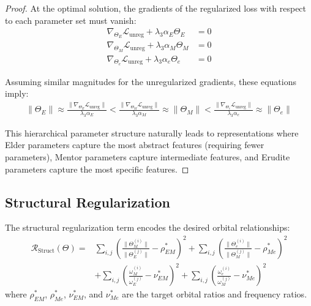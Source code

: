 \begin{proof}
At the optimal solution, the gradients of the regularized loss with respect to each parameter set must vanish:
\begin{align}
\nabla_{\Theta_E} \mathcal{L}_{\text{unreg}} + \lambda_3 \alpha_E \Theta_E &= 0 \\
\nabla_{\Theta_M} \mathcal{L}_{\text{unreg}} + \lambda_3 \alpha_M \Theta_M &= 0 \\
\nabla_{\Theta_e} \mathcal{L}_{\text{unreg}} + \lambda_3 \alpha_e \Theta_e &= 0
\end{align}

Assuming similar magnitudes for the unregularized gradients, these equations imply:
\begin{align}
\|\Theta_E\| \approx \frac{\|\nabla_{\Theta_E} \mathcal{L}_{\text{unreg}}\|}{\lambda_3 \alpha_E} < \frac{\|\nabla_{\Theta_M} \mathcal{L}_{\text{unreg}}\|}{\lambda_3 \alpha_M} \approx \|\Theta_M\| < \frac{\|\nabla_{\Theta_e} \mathcal{L}_{\text{unreg}}\|}{\lambda_3 \alpha_e} \approx \|\Theta_e\|
\end{align}

This hierarchical parameter structure naturally leads to representations where Elder parameters capture the most abstract features (requiring fewer parameters), Mentor parameters capture intermediate features, and Erudite parameters capture the most specific features.
\end{proof}

\subsection{Structural Regularization}

\begin{definition}
The structural regularization term encodes the desired orbital relationships:
\begin{align}
\mathcal{R}_{\text{Struct}}(\Theta) = &\sum_{i,j} \left(\frac{\|\Theta_M^{(i)}\|}{\|\Theta_E^{(j)}\|} - \rho_{EM}^*\right)^2 + \sum_{i,j} \left(\frac{\|\Theta_e^{(i)}\|}{\|\Theta_M^{(j)}\|} - \rho_{Me}^*\right)^2 \\
&+ \sum_{i,j} \left(\frac{\omega_M^{(i)}}{\omega_E^{(j)}} - \nu_{EM}^*\right)^2 + \sum_{i,j} \left(\frac{\omega_e^{(i)}}{\omega_M^{(j)}} - \nu_{Me}^*\right)^2
\end{align}
where $\rho_{EM}^*$, $\rho_{Me}^*$, $\nu_{EM}^*$, and $\nu_{Me}^*$ are the target orbital ratios and frequency ratios.
\end{definition}

